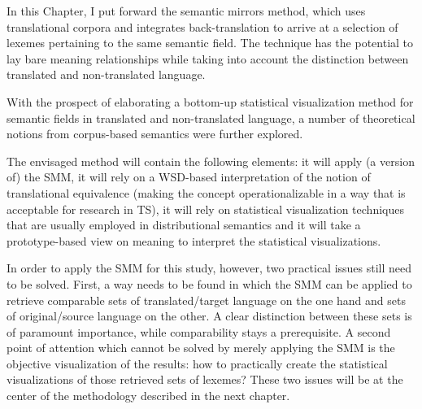 In this Chapter, I put forward the semantic mirrors method, which uses translational corpora and integrates back-translation to arrive at a selection of lexemes pertaining to the same semantic field. The technique has the potential to lay bare meaning relationships while taking into account the distinction between translated and non-translated language.

With the prospect of elaborating a bottom-up statistical visualization method for semantic fields in translated and non-translated language, a number of theoretical notions from corpus-based semantics were further explored.

The envisaged method will contain the following elements: it will apply (a version of) the SMM, it will rely on a WSD-based interpretation of the notion of translational equivalence (making the concept operationalizable in a way that is acceptable for research in TS), it will rely on statistical visualization techniques that are usually employed in distributional semantics and it will take a prototype-based view on meaning to interpret the statistical visualizations.

In order to apply the SMM for this study, however, two practical issues still need to be solved. First, a way needs to be found in which the SMM can be applied to retrieve comparable sets of translated/target language on the one hand and sets of original/source language on the other. A clear distinction between these sets is of paramount importance, while comparability stays a prerequisite. A second point of attention which cannot be solved by merely applying the SMM is the objective visualization of the results: how to practically create the statistical visualizations of those retrieved sets of lexemes? These two issues will be at the center of the methodology described in the next chapter.
